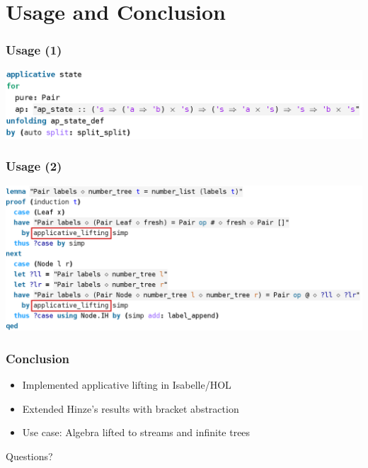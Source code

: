 \documentclass[smaller,leqno]{beamer}
\begin{document}
\section{Usage and Conclusion} %

\begin{frame}
\frametitle{Usage (1)}
\begin{center}
\includegraphics[width=\textwidth]{screenshot1.png}
\end{center}
\end{frame}

\begin{frame}
\frametitle{Usage (2)}
\begin{center}
\includegraphics[width=\textwidth]{screenshot2.png}
\end{center}
\end{frame}

\begin{frame}
\frametitle{Conclusion}
\begin{itemize}
\item Implemented applicative lifting in Isabelle/HOL
\item Extended Hinze's results with bracket abstraction
\item Use case: Algebra lifted to streams and infinite trees
\end{itemize}

\vspace{10mm}
\begin{center}\large Questions?\end{center}
\end{frame}

\appendix %
\end{document}
